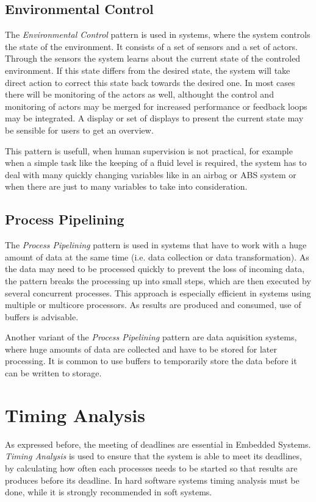\documentclass[10pt,a4paper,titlepage,draft]{article} %
\begin{document}
\subsection{Environmental Control}
The \emph{Environmental Control} pattern is used in systems, where the system controls the state of the environment.
It consists of a set of sensors and a set of actors.
Through the sensors the system learns about the current state of the controled environment.
If this state differs from the desired state, the system will take direct action to correct this state back towards the desired one.
In most cases there will be monitoring of the actors as well, althought the control and monitoring of actors may be merged for increased performance or feedback loops may be integrated.
A display or set of displays to present the current state may be sensible for users to get an overview.

This pattern is usefull, when human supervision is not practical, for example when a simple task like the keeping of a fluid level is required, the system has to deal with many quickly changing variables like in an airbag or ABS system or when there are just to many variables to take into consideration.

\subsection{Process Pipelining}
The \emph{Process Pipelining} pattern is used in systems that have to work with a huge amount of data at the same time (i.e. data collection or data transformation).
As the data may need to be processed quickly to prevent the loss of incoming data, the pattern breaks the processing up into small steps, which are then executed by several concurrent processes.
This approach is especially efficient in systems using multiple or multicore processors.
As results are produced and consumed, use of buffers is advisable.

Another variant of the \emph{Process Pipelining} pattern are data aquisition systems, where huge amounts of data are collected and have to be stored for later processing.
It is common to use buffers to temporarily store the data before it can be written to storage.

\section{Timing Analysis}
As expressed before, the meeting of deadlines are essential in Embedded Systems.
\emph{Timing Analysis} is used to ensure that the system is able to meet its deadlines, by calculating how often each processes needs to be started so that results are produces before its deadline.
In hard software systems timing analysis must be done, while it is strongly recommended in soft systems.
\end{document}
